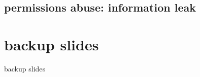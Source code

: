 \subsection{permissions abuse: information leak}








\section{backup slides}
\begin{frame}{backup slides}
\end{frame}




